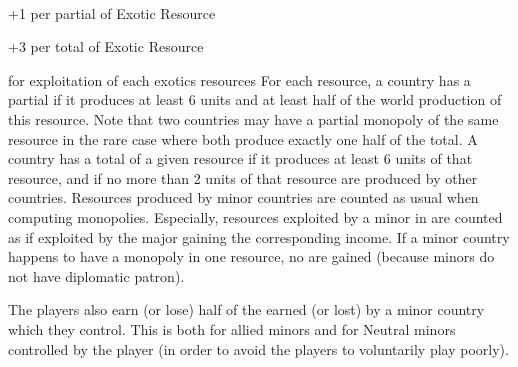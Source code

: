 ~\\
\begin{modlist}
\item[+1] per partial  of Exotic Resource
\item[+3] per total  of Exotic Resource
\end{modlist}

\label{chVictories:MonopolyExoticResources} for exploitation of each
exotics resources
\bparag For each resource, a country has a partial  if
it produces at least 6 units and at least half of the world production
of this resource. Note that two countries may have a partial monopoly of
the same resource in the rare case where both produce exactly one half
of the total.
\bparag A country has a total  of a given resource if it
produces at least 6 units of that resource, and if no more than 2 units
of that resource are produced by other countries.
\bparag Resources produced by minor countries are counted as usual when
computing monopolies. Especially, resources exploited by a minor in
\dipAT are counted as if exploited by the major gaining the
corresponding income.
\bparag If a \ROTW minor country happens to have a monopoly
in one resource, no \VPs are gained (because \ROTW minors do not have
diplomatic patron).

The players also earn (or lose) half of the \VPs earned (or lost) by a minor
country which they control.
\bparag This is both for allied minors and for Neutral minors controlled by
the player (in order to avoid the players to voluntarily play poorly).

